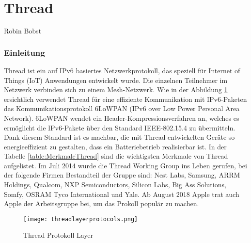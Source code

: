 \vspace*{4cm}
\part{Thread}\label{part:Thread}
Robin Bobst
\vspace*{\fill}
\clearpage

\section{Einleitung}\label{sec:EinleitungThread}
Thread ist ein auf IPv6 basiertes Netzwerkprotokoll, das speziell für Internet of Things (IoT) Anwendungen entwickelt wurde. Die einzelnen Teilnehmer im Netzwerk verbinden sich zu einem Mesh-Netzwerk. Wie in der Abbildung \ref{fig:ThreadProtokollLayer} ersichtlich verwendet Thread für eine effiziente Kommunikation mit IPv6-Paketen das Kommunikationsprotokoll 6LoWPAN (IPv6 over Low Power Personal Area Network). 6LoWPAN wendet ein Header-Kompressionsverfahren an, welches es ermöglicht die IPv6-Pakete über den Standard IEEE-802.15.4 zu übermitteln. Dank diesem Standard ist es machbar, die mit Thread entwickelten Geräte so energieeffizient zu gestalten, dass ein Batteriebetrieb realisierbar ist. In der Tabelle \ref{table:MerkmaleThread} sind die wichtigsten Merkmale von Thread aufgelistet. Im Juli 2014 wurde die Thread Working Group ins Leben gerufen, bei der folgende Firmen Bestandteil der Gruppe sind: Nest Labs, Samsung, ARRM Holdings, Qualcom, NXP Semiconductors, Silicon Labs, Big Ass Solutions, Somfy, OSRAM Tyco International und Yale. Ab August 2018 Apple trat auch Apple der Arbeitsgruppe bei, um das Prokoll populär zu machen. \\

\begin{figure}[H]
	\centering
	\texttt{[image: threadlayerprotocols.png]}
	\caption{Thread Protokoll Layer \cite{erickson_picture_2019}}
	\label{fig:ThreadProtokollLayer}
\end{figure}


